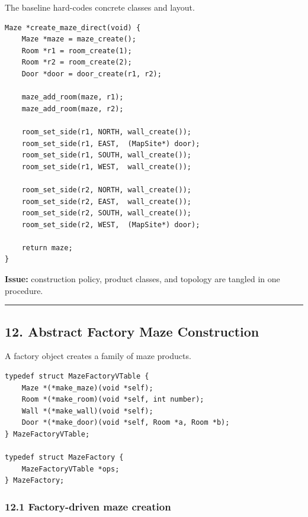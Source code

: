 \documentclass[11pt]{article}
\begin{document}
The baseline hard-codes concrete classes and layout.

\begin{verbatim}
Maze *create_maze_direct(void) {
    Maze *maze = maze_create();
    Room *r1 = room_create(1);
    Room *r2 = room_create(2);
    Door *door = door_create(r1, r2);

    maze_add_room(maze, r1);
    maze_add_room(maze, r2);

    room_set_side(r1, NORTH, wall_create());
    room_set_side(r1, EAST,  (MapSite*) door);
    room_set_side(r1, SOUTH, wall_create());
    room_set_side(r1, WEST,  wall_create());

    room_set_side(r2, NORTH, wall_create());
    room_set_side(r2, EAST,  wall_create());
    room_set_side(r2, SOUTH, wall_create());
    room_set_side(r2, WEST,  (MapSite*) door);

    return maze;
}
\end{verbatim}

\textbf{Issue:} construction policy, product classes, and topology are tangled in one procedure.

\begin{center}\rule{0.5\linewidth}{0.5pt}\end{center}

\subsection{12. Abstract Factory Maze Construction}\label{abstract-factory-maze-construction}

A factory object creates a family of maze products.

\begin{verbatim}
typedef struct MazeFactoryVTable {
    Maze *(*make_maze)(void *self);
    Room *(*make_room)(void *self, int number);
    Wall *(*make_wall)(void *self);
    Door *(*make_door)(void *self, Room *a, Room *b);
} MazeFactoryVTable;

typedef struct MazeFactory {
    MazeFactoryVTable *ops;
} MazeFactory;
\end{verbatim}

\subsubsection{12.1 Factory-driven maze creation}\label{factory-driven-maze-creation}
\end{document}
